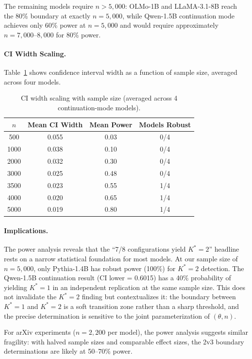 \documentclass[11pt,a4paper]{article}
\begin{document}
The remaining models require $n > 5{,}000$: OLMo-1B and LLaMA-3.1-8B reach the 80\% boundary at exactly $n=5{,}000$, while Qwen-1.5B continuation mode achieves only 60\% power at $n=5{,}000$ and would require approximately $n=7{,}000$--$8{,}000$ for 80\% power.

\paragraph{CI Width Scaling.}
Table~\ref{tab:ci_width} shows confidence interval width as a function of sample size, averaged across four models.

\begin{table}[h]
\centering
\caption{CI width scaling with sample size (averaged across 4 continuation-mode models).}
\label{tab:ci_width}
\small
\begin{tabular}{cccc}
\toprule
\textbf{$n$} & \textbf{Mean CI Width} & \textbf{Mean Power} & \textbf{Models Robust} \\
\midrule
500 & 0.055 & 0.03 & 0/4 \\
1000 & 0.038 & 0.10 & 0/4 \\
2000 & 0.032 & 0.30 & 0/4 \\
3000 & 0.025 & 0.48 & 0/4 \\
3500 & 0.023 & 0.55 & 1/4 \\
4000 & 0.020 & 0.65 & 1/4 \\
5000 & 0.019 & 0.80 & 1/4 \\
\bottomrule
\end{tabular}
\end{table}

\paragraph{Implications.}
The power analysis reveals that the ``7/8 configurations yield $K^*=2$'' headline rests on a narrow statistical foundation for most models. At our sample size of $n=5{,}000$, only Pythia-1.4B has robust power (100\%) for $K^*=2$ detection. The Qwen-1.5B continuation result (CI lower = 0.6015) has a 40\% probability of yielding $K^*=1$ in an independent replication at the same sample size. This does not invalidate the $K^*=2$ finding but contextualizes it: the boundary between $K^*=1$ and $K^*=2$ is a soft transition zone rather than a sharp threshold, and the precise determination is sensitive to the joint parameterization of $(\theta, n)$.

For arXiv experiments ($n=2{,}200$ per model), the power analysis suggests similar fragility: with halved sample sizes and comparable effect sizes, the 2v3 boundary determinations are likely at 50--70\% power.
\end{document}
